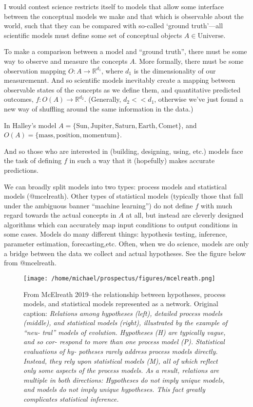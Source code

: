 I would contest science restricts itself to models that allow some
interface between the conceptual models we make and that which is
observable about the world, such that they can be compared with
so-called `ground truth'---all scientific models must define some set of
conceptual objects \(A \in \text{Universe}\).

To make a comparison between a model and ``ground truth'', there must be
some way to observe and measure the concepts \(A\). More formally, there
must be some observation mapping \(O: A \to \mathbb{R}^{d_1}\), where
\(d_1\) is the dimensionality of our measuremennt. And so scientific
models inevitably create a mapping between observable states of the
concepts as we define them, and quantitative predicted outcomes,
\(f : O(A) \to \mathbb{R}^{d_2}\). (Generally, \(d_2 << d_1\), otherwise
we've just found a new way of shuffling around the same information in
the data.)

In Halley's model
\(A = \{\text{Sun}, \text{Jupiter}, \text{Saturn}, \text{Earth}, \text{Comet} \}\),
and \(O(A) = \{\text{mass}, \text{position}, \text{momentum}\}\).

And so those who are interested in (building, designing, using, etc.)
models face the task of defining \(f\) in such a way that it (hopefully)
makes accurate predictions.

We can broadly split models into two types: process models and
statistical models (@mcelreath). Other types of statistical models
(typically those that fall under the ambiguous banner ``machine
learning'') do not define \(f\) with much regard towards the actual
concepts in \(A\) at all, but instead are cleverly designed algorithms
which can accurately map input conditions to output conditions in some
cases. Models do many different things: hypothesis testing, inference,
parameter estimation, forecasting,etc. Often, when we do science, models
are only a bridge between the data we collect and actual hypotheses. See
the figure below from @mcelreath.

\begin{figure}
\centering
\texttt{[image: /home/michael/prospectus/figures/mcelreath.png]}
\caption{From McElreath 2019--the relationship between hypotheses,
process models, and statistical models represented as a network.
Original caption: \emph{Relations among hypotheses (left), detailed
process models (middle), and statistical models (right), illustrated by
the example of ``neu- tral'' models of evolution. Hypotheses (H) are
typically vague, and so cor- respond to more than one process model (P).
Statistical evaluations of hy- potheses rarely address process models
directly. Instead, they rely upon statistical models (M), all of which
reflect only some aspects of the process models. As a result, relations
are multiple in both directions: Hypotheses do not imply unique models,
and models do not imply unique hypotheses. This fact greatly complicates
statistical inference.}}
\end{figure}

